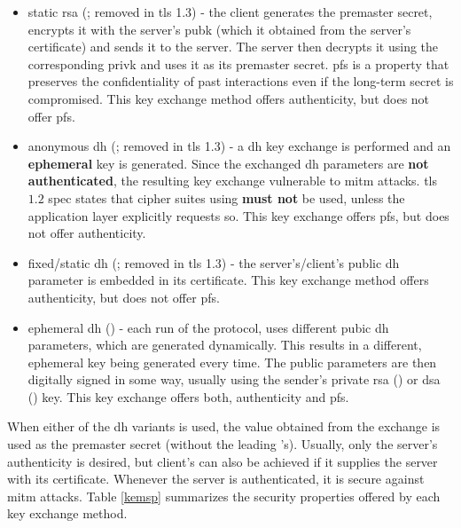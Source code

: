 \documentclass{llncs}
\begin{document}
{\begin{itemize}
  \item static \gls{rsa} (; removed in \gls{tls} 1.3) - the client generates the premaster secret, encrypts it with the
  server's \gls{pubk} (which it obtained from the server's  certificate) and
  sends it to the server. The server then decrypts it using the corresponding \gls{privk} and uses it as its premaster secret. \gls{pfs} is
  a property that preserves the confidentiality of past interactions even if the
  long-term secret is compromised. This key exchange method offers authenticity, but does not offer \gls{pfs}.
  \item anonymous \gls{dh} (; removed in \gls{tls} 1.3) - a \gls{dh} key exchange is
  performed and an \textbf{ephemeral} key is generated. Since the exchanged \gls{dh}
  parameters are \textbf{not authenticated}, the resulting key exchange
  vulnerable to \gls{mitm} attacks. \gls{tls} $1.2$ spec states that cipher suites
  using  \textbf{must not} be used, unless the application
  layer explicitly requests so. This key exchange offers \gls{pfs}, but does not offer
  authenticity.
  \item fixed/static \gls{dh} (; removed in \gls{tls} 1.3) - the server's/client's public \gls{dh} parameter
  is embedded in its certificate. This key exchange method offers authenticity,
  but does not offer \gls{pfs}.
  \item ephemeral \gls{dh} () - each run of the protocol, uses
  different pubic \gls{dh} parameters, which are generated dynamically. This results
  in a different, ephemeral key being generated every time. The public parameters
  are then digitally signed in some way, usually using the sender's private
  \gls{rsa} () or \gls{dsa} () key. This key
  exchange offers both, authenticity and \gls{pfs}.
\end{itemize}

When either of the \gls{dh} variants is used, the value obtained from the exchange is used
as the premaster secret (without the leading 's). Usually, only the server's
authenticity is desired, but client's can also be achieved if it supplies the
server with its certificate. Whenever the server is authenticated, it is secure
against \gls{mitm} attacks. Table \ref{kemsp} summarizes the security properties
offered by each key exchange method.

}
\end{document}
